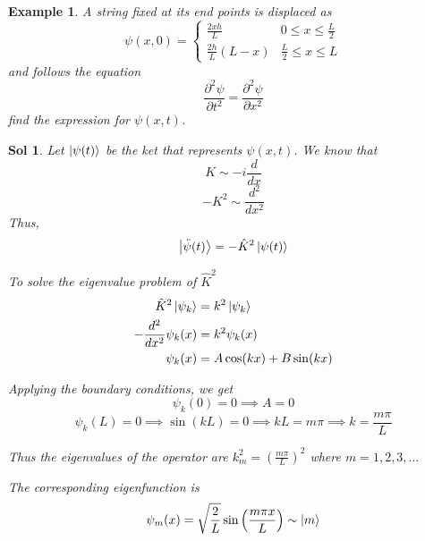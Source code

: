 \documentclass[12pt,a4paper]{report}
\newcommand{\der}[2]{\frac{d#1}{d#2}}
\newcommand{\nder}[3]{\frac{d^#3#1}{d#2^#3}}
\newcommand{\nparder}[3]{\frac{\partial^#1#2}{\partial#3^#1}}
\newtheorem{example}{Example}[section]
\newtheorem*{solution}{Sol}
\begin{document}
\begin{example}
    A string fixed at its end points is displaced as
    \begin{equation*}
        \psi(x, 0) = \begin{cases}
            \frac{2xh}{L} & 0 \leq x \leq \frac{L}{2} \\
            \frac{2h}{L}(L-x) & \frac{L}{2} \leq x \leq L
        \end{cases}
    \end{equation*}
    and follows the equation
    \begin{equation*}
        \nparder{2}{\psi}{t} = \nparder{2}{\psi}{x}
    \end{equation*}
    find the expression for $\psi(x, t)$.
\end{example}
\begin{solution}
    Let $\ket{\psi(t)}$ be the ket that represents $\psi(x, t)$.
    We know that
    \begin{equation*}
        K \sim -i\der{}{x}
    \end{equation*}
    \begin{equation*}
        -K^2 \sim \nder{}{x}{2}
    \end{equation*}
    Thus,
    \begin{equation*}
        \ket{\ddot{\psi}(t)} = -\hat{K}^2\ket{\psi(t)}
    \end{equation*}

    To solve the eigenvalue problem of $\hat{K}^2$
    \begin{align*}
        \hat{K}^2\ket{\psi_k} &= k^2\ket{\psi_k} \\
        -\nder{}{x}{2} \psi_k(x) &= k^2\psi_k(x) \\
        \psi_k(x) &= A\cos(kx) + B\sin(kx)
    \end{align*}

    Applying the boundary conditions, we get
    \begin{equation*}
        \psi_k(0) = 0 \implies A = 0
    \end{equation*}
    \begin{equation*}
        \psi_k(L) = 0 \implies \sin(kL) = 0 \implies kL = m\pi \implies k = \frac{m\pi}{L}
    \end{equation*}

    Thus the eigenvalues of the operator are $k_m^2 = \left(\frac{m\pi}{L}\right)^2$ where $m = 1, 2, 3, \dots$
    
    The corresponding eigenfunction is
    \begin{equation*}
        \psi_m(x) = \sqrt{\frac{2}{L}}\sin\left( \frac{m\pi x}{L} \right) \sim \ket{m}
    \end{equation*}


\end{solution}
\end{document}
